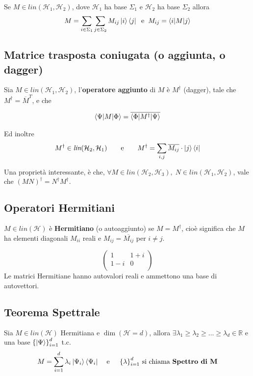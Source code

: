 Se $M\in \textit{lin}(\mathcal{H}_1,\mathcal{H}_2)$, dove $\mathcal{H}_1$ ha base $\Sigma_1$ e  $\mathcal{H}_2$ ha base $\Sigma_2$ allora 
$$M = \sum_{i \in \Sigma_1}\sum_{j \in \Sigma_2} M_{ij} \ket{i}\bra{j}\hspace{0.2cm} \text{e} \hspace{0.2cm} M_{ij} = \braket{i|M|j}$$

\subsection{Matrice trasposta coniugata (o aggiunta, o dagger)}
Sia  $M\in \textit{lin}(\mathcal{H}_1,\mathcal{H}_2)$, l'\textbf{operatore aggiunto} di $M$ è $M^\dagger$ (dagger), tale che $M^\dagger = \overline{M}^T$, e che

$$
\braket{\Psi|M|\Phi} = \overline{\braket{\Phi|M^\dagger|\Psi}}
$$

Ed inoltre
$$M^\dagger\in \textit{lin}(\mathcal{H}_2,\mathcal{H}_1) \qquad \text{e} \qquad M^\dagger = \sum_{i,j} \overline{M_{ij}} \cdot\ket{j}\bra{i}$$

Una proprietà interessante, è che, $\forall M \in \textit{lin}(\mathcal H_2, \mathcal H_3),\; N \in \textit{lin}(\mathcal H_1, \mathcal H_2)$, vale che $(MN)^\dagger = N^\dagger M^\dagger$.

\subsection{Operatori Hermitiani}
$M\in \textit{lin}(\mathcal{H})$ è \textbf{Hermitiano} (o autoaggiunto) se $M = M^\dagger$, cioè significa che $M$ ha elementi diagonali $M_{ii}$ reali e $M_{ij} = \overline{M_{ij}}$ per $i\neq j$.

$$\begin{pmatrix}
	1 & 1+i \\
	1-i & 0\\
\end{pmatrix}$$
Le matrici Hermitiane hanno autovalori reali e ammettono una base di autovettori.

\subsection{Teorema Spettrale}
Sia $M\in \textit{lin}(\mathcal{H})$ Hermitiana e $\dim (\mathcal{H} = d)$, allora 
$\exists \lambda_1\ge\lambda_2\ge\dots\ge \lambda_d \in \mathbb{R}$ e una base $\left\{\ket{\Psi}\right\} ^d_{i=1} $ t.c.
$$M = \sum^d_{i=1}\lambda_i \ket{\Psi_i}\bra{\Psi_i}\hspace{0.4cm} \text{e\hspace{0.4cm} $\left\{ \lambda\right\} ^d_{i=1} $ si chiama \textbf{Spettro di M}}$$

